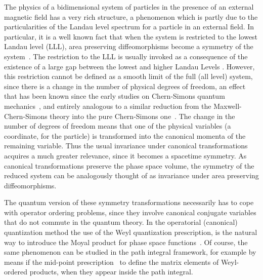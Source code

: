\documentclass[a4paper,12pt]{article}
\begin{document}
The physics of a bidimensional system of particles in the presence
of
an external magnetic field has a very rich structure, a phenomenon
which is partly due to the particularities of the Landau level
spectrum for a particle in an external field.  In particular, it is
a
well known fact that when the system is restricted to the lowest
Landau level (LLL), area preserving diffeomorphisms become a
symmetry
of the system~\cite{IK,SS,GCT}.  The restriction to the LLL is
usually
invoked as a consequence of the existence of a large gap between
the
lowest and higher Landau Levels \cite{gj}. However, this
restriction
cannot be defined as a smooth limit of the full (all level) system,
since there is a change in the number of physical degrees of
freedom,
an effect that has been known since the early studies on
Chern-Simons
quantum mechanics~\cite{jackiw}, and entirely analogous to a
similar
reduction from the Maxwell-Chern-Simons theory into the pure
Chern-Simons one~\cite{IK,jackiw}.  The change in the number of
degrees of freedom means that one of the physical variables (a
coordinate, for the particle) is transformed into the canonical
momenta of the remaining variable. Thus the usual invariance under
canonical transformations acquires a much greater relevance, since
it
becomes a spacetime symmetry. As canonical transformations preserve
the phase space volume, the symmetry of the reduced system can be
analogously thought of as invariance under area preserving
diffeomorphisms.

The quantum version of these symmetry transformations necessarily
has
to cope with operator ordering problems, since they involve
canonical
conjugate variables that do not commute in the quantum theory.  In
the
operatorial (canonical) quantization method the use of the Weyl
quantization prescription, is the natural way to introduce the
Moyal
product for phase space functions~\cite{castellani}. Of course, the
same phenomenon can be studied in the path integral framework, for
example by means if the mid-point prescription~\cite{midpoint} to
define the matrix elements of Weyl-ordered products, when they
appear
inside the path integral.
\end{document}
